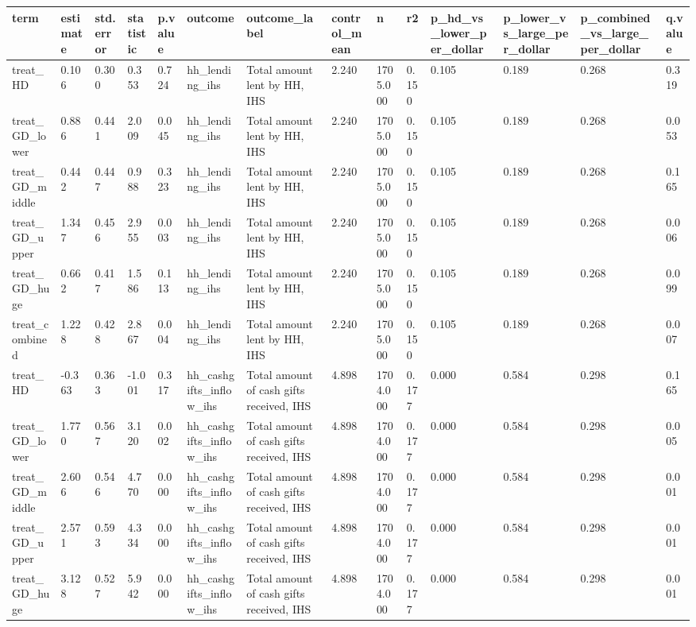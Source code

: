\begin{tabular}{llllllllllllll}
\toprule
term & estimate & std.error & statistic & p.value & outcome & outcome\_label & control\_mean & n & r2 & p\_hd\_vs\_lower\_per\_dollar & p\_lower\_vs\_large\_per\_dollar & p\_combined\_vs\_large\_per\_dollar & q.value
 \\
\midrule
treat\_HD & 0.106 & 0.300 & 0.353 & 0.724 & hh\_lending\_ihs & Total amount lent by HH, IHS & 2.240 & 1705.000 & 0.150 & 0.105 & 0.189 & 0.268 & 0.319 \\
treat\_GD\_lower & 0.886 & 0.441 & 2.009 & 0.045 & hh\_lending\_ihs & Total amount lent by HH, IHS & 2.240 & 1705.000 & 0.150 & 0.105 & 0.189 & 0.268 & 0.053 \\
treat\_GD\_middle & 0.442 & 0.447 & 0.988 & 0.323 & hh\_lending\_ihs & Total amount lent by HH, IHS & 2.240 & 1705.000 & 0.150 & 0.105 & 0.189 & 0.268 & 0.165 \\
treat\_GD\_upper & 1.347 & 0.456 & 2.955 & 0.003 & hh\_lending\_ihs & Total amount lent by HH, IHS & 2.240 & 1705.000 & 0.150 & 0.105 & 0.189 & 0.268 & 0.006 \\
treat\_GD\_huge & 0.662 & 0.417 & 1.586 & 0.113 & hh\_lending\_ihs & Total amount lent by HH, IHS & 2.240 & 1705.000 & 0.150 & 0.105 & 0.189 & 0.268 & 0.099 \\
treat\_combined & 1.228 & 0.428 & 2.867 & 0.004 & hh\_lending\_ihs & Total amount lent by HH, IHS & 2.240 & 1705.000 & 0.150 & 0.105 & 0.189 & 0.268 & 0.007 \\
treat\_HD & -0.363 & 0.363 & -1.001 & 0.317 & hh\_cashgifts\_inflow\_ihs & Total amount of cash gifts received, IHS & 4.898 & 1704.000 & 0.177 & 0.000 & 0.584 & 0.298 & 0.165 \\
treat\_GD\_lower & 1.770 & 0.567 & 3.120 & 0.002 & hh\_cashgifts\_inflow\_ihs & Total amount of cash gifts received, IHS & 4.898 & 1704.000 & 0.177 & 0.000 & 0.584 & 0.298 & 0.005 \\
treat\_GD\_middle & 2.606 & 0.546 & 4.770 & 0.000 & hh\_cashgifts\_inflow\_ihs & Total amount of cash gifts received, IHS & 4.898 & 1704.000 & 0.177 & 0.000 & 0.584 & 0.298 & 0.001 \\
treat\_GD\_upper & 2.571 & 0.593 & 4.334 & 0.000 & hh\_cashgifts\_inflow\_ihs & Total amount of cash gifts received, IHS & 4.898 & 1704.000 & 0.177 & 0.000 & 0.584 & 0.298 & 0.001 \\
treat\_GD\_huge & 3.128 & 0.527 & 5.942 & 0.000 & hh\_cashgifts\_inflow\_ihs & Total amount of cash gifts received, IHS & 4.898 & 1704.000 & 0.177 & 0.000 & 0.584 & 0.298 & 0.001 \\

\end{tabular}
